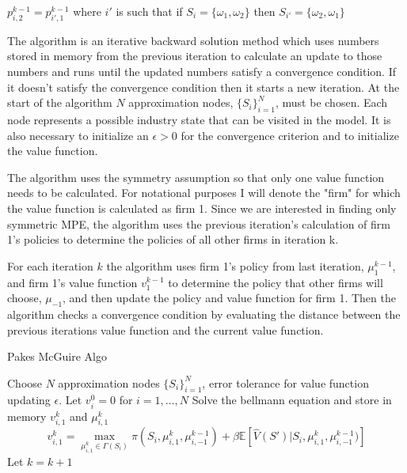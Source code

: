 \documentclass[12pt]{article}
\newcommand{\norm}[1]{\left\lVert#1\right\rVert}
\begin{document}
$p^{k-1}_{i,2}=p^{k-1}_{i',1}$ where $i'$ is such that if $S_i=\{\omega_1,\omega_2\}$ then $S_{i'}=\{\omega_2,\omega_1\}$

The \citet{1992_Pakes_McGuire_NBER} algorithm is an iterative backward solution method which uses numbers stored in memory from the previous iteration to calculate an update to those numbers and runs until the updated numbers satisfy a convergence condition. If it doesn't satisfy the convergence condition then it starts a new iteration. At the start of the algorithm $N$ approximation nodes, $\{S_i\}_{i=1}^N$, must be chosen. Each node represents a possible industry state that can be visited in the model. It is also necessary to initialize an $\epsilon>0$ for the convergence criterion and to initialize the value function.

The algorithm uses the symmetry assumption so that only one value function needs to be calculated. For notational purposes I will denote the "firm" for which the value function is calculated as firm 1. Since we are interested in finding only symmetric MPE, the \citet{1992_Pakes_McGuire_NBER} algorithm uses the previous iteration's calculation of firm 1's policies to determine the policies of all other firms in iteration k.

For each iteration $k$ the algorithm uses firm 1's  policy from last iteration, $\mu^{k-1}_1$, and firm 1's value function $v^{k-1}_1$ to determine the policy that other firms will choose, $\mu_{-1}$, and then update the policy and value function for firm 1. Then the algorithm checks a convergence condition by evaluating the distance between the previous iterations value function and the current value function.

\begin{algorithm}[H]
  \caption{Pakes McGuire Algo}
  \begin{algorithmic}[1]
    \Procedure{}{} Choose $N$ approximation nodes $\{S_i\}_{i=1}^N$, error tolerance for value function updating $\epsilon$.
    \State Let $v^0_i=0$ for $i=1,\dots,N$
    \While{$\norm{v^{k}_1-v^{k-1}_1} > \frac{\epsilon (1-\beta)}{2\beta}$}
    \State Solve the bellmann equation and store in memory $v^k_{i,1}$ and $\mu^k_{i,1}$
    \begin{equation*}
      v^k_{i,1}=\max_{\mu^k_{i,1} \in \Gamma(S_i)} \pi(S_i, \mu^k_{i,1}, \mu^{k-1}_{i,-1})+ \beta\mathbb{E}[\hat{V}(S')|S_i,\mu^k_{i,1},\mu^{k-1}_{i,-1})]
    \end{equation*}
    \State Let $k=k+1$
    \EndFor
    \EndWhile
    \EndProcedure
  \end{algorithmic}
\end{algorithm}
\end{document}
